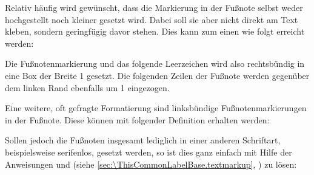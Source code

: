 \IfThisCommonFirstRun{\iftrue}{\csname iffalse\endcsname}%
  \begin{Example}
    Relativ häufig wird gewünscht, dass die Markierung in der
    Fußnote selbst weder hochgestellt noch kleiner gesetzt wird. Dabei soll
    sie aber nicht direkt am Text kleben, sondern geringfügig davor
    stehen. Dies kann zum einen wie folgt erreicht werden:
\begin{lstcode}
\end{lstcode}
    Die Fußnotenmarkierung und das folgende Leerzeichen wird also rechtsbündig
    in eine Box der Breite 1 gesetzt.  Die folgenden Zeilen der
    Fußnote werden gegenüber dem linken Rand ebenfalls um 1
    eingezogen.

    Eine weitere, oft gefragte Formatierung sind linksbündige
    Fußnotenmarkierungen in der Fußnote. Diese können mit folgender Definition
    erhalten werden:
\begin{lstcode}
\end{lstcode}

    Sollen jedoch die Fußnoten insgesamt lediglich in einer anderen
    Schriftart, beispielsweise serifenlos, gesetzt werden, so ist dies ganz
    einfach mit Hilfe der Anweisungen
     und
     (siehe
    \autoref{sec:\ThisCommonLabelBase.textmarkup},
    ) zu lösen:
\begin{lstcode}
\end{lstcode}%
  \end{Example}%
\fi%
%
%
\EndIndexGroup
\EndIndexGroup

